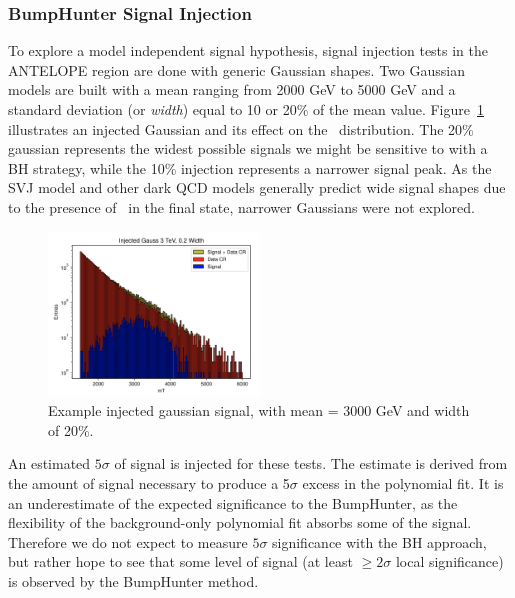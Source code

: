 \subsubsection{BumpHunter Signal Injection}
\label{subsec:bhsiginj}

To explore a model independent signal hypothesis, signal injection tests in the ANTELOPE region are done with generic Gaussian shapes.
Two Gaussian models are built with a mean ranging from 2000 GeV to 5000 GeV and a standard deviation (or \textit{width}) equal to 10 or 20\% of the mean value.
Figure~\ref{fig:gauss_inj} illustrates an injected Gaussian and its effect on the \mt~distribution.
The 20\% gaussian represents the widest possible signals we might be sensitive to with a BH strategy, while the 10\% injection represents a narrower signal peak. 
As the SVJ model and other dark QCD models generally predict wide signal shapes due to the presence of \met~in the final state, narrower Gaussians were not explored.

\begin{figure}[!htbp]
\centering
   \includegraphics[width=0.5\textwidth]{figures/stats/gauss_inj}
    \caption{Example injected gaussian signal, with mean = 3000 GeV and width of 20\%.
    \label{fig:gauss_inj}}
\end{figure}


An estimated $5\sigma$ of signal is injected for these tests.
The estimate is derived from the amount of signal necessary to produce a 5$\sigma$ excess in the polynomial fit.
It is an underestimate of the expected significance to the BumpHunter, as the flexibility of the background-only polynomial fit absorbs some of the signal.
Therefore we do not expect to measure $5\sigma$ significance with the BH approach, but rather hope to see that some level of signal (at least $\geq2\sigma$ local significance) is observed by the BumpHunter method.

